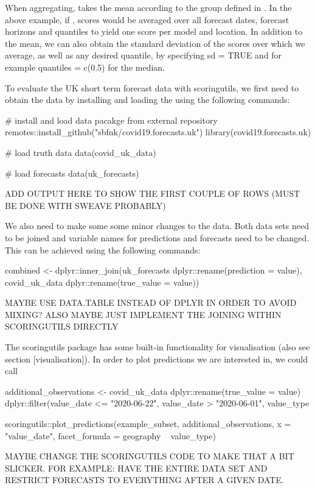\documentclass[article]{jss}
\begin{document}
When aggregating,  takes the mean according to the group defined in . In the above example, if , scores would be averaged over all forecast dates, forecast horizons and quantiles to yield one score per model and location. In addition to the mean, we can also obtain the standard deviation of the scores over which we average, as well as any desired quantile, by specifying sd = TRUE and for example quantiles = c(0.5) for the median.

To evaluate the UK short term forecast data with scoringutils, we first need to obtain the data by installing and loading the  using the following commands: 

\begin{CodeInput}
# install and load data pacakge from external repository
remotes::install_github("sbfnk/covid19.forecasts.uk")
library(covid19.forecasts.uk)

# load truth data
data(covid_uk_data)

# load forecasts
data(uk_forecasts)
\end{CodeInput}

ADD OUTPUT HERE TO SHOW THE FIRST COUPLE OF ROWS (MUST BE DONE WITH SWEAVE PROBABLY)

We also need to make some some minor changes to the data. Both data sets need to be joined and variable names for predictions and forecasts need to be changed. This can be achieved using the following commands: 

\begin{CodeInput}
combined <- dplyr::inner_join(uk_forecasts %
                                dplyr::rename(prediction = value), 
                              covid_uk_data %
                                dplyr::rename(true_value = value))
\end{CodeInput}
MAYBE USE DATA.TABLE INSTEAD OF DPLYR IN ORDER TO AVOID MIXING? ALSO MAYBE JUST IMPLEMENT THE JOINING WITHIN SCORINGUTILS DIRECTLY

The scoringutils package has some built-in functionality for visualisation (also see section [visualisation]). In order to plot predictions we are interested in, we could call 
\begin{CodeInput}
additional_observations <- covid_uk_data %
  dplyr::rename(true_value = value) %
  dplyr::filter(value_date <= "2020-06-22", 
                value_date > "2020-06-01", 
                value_type %

scoringutils::plot_predictions(example_subset, 
                               additional_observations,
                               x = "value_date",
                               facet_formula = geography ~ value_type)
\end{CodeInput}
MAYBE CHANGE THE SCORINGUTILS CODE TO MAKE THAT A BIT SLICKER. FOR EXAMPLE: HAVE THE ENTIRE DATA SET AND RESTRICT FORECASTS TO EVERYTHING AFTER A GIVEN DATE. 
\end{document}
